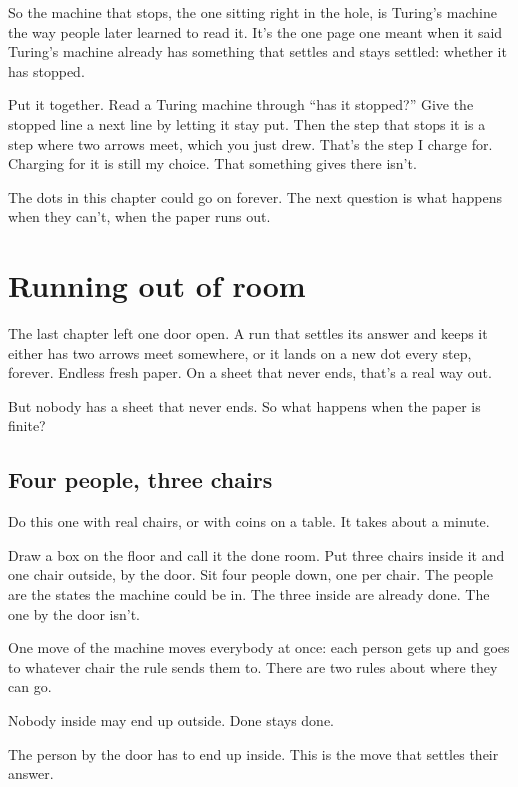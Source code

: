 \documentclass[11pt,twoside]{article}
\theoremstyle{thielethm}
\theoremstyle{thieledef}
\theoremstyle{thieledef}
\theoremstyle{thieledef}
\theoremstyle{thielethm}
\theoremstyle{thieleobs}
\theoremstyle{thielethm}
\begin{document}
So the machine that stops, the one sitting right in the hole, is Turing's machine the way people later learned to read it. It's the one page one meant when it said Turing's machine already has something that settles and stays settled: whether it has stopped.

Put it together. Read a Turing machine through ``has it stopped?'' Give the stopped line a next line by letting it stay put. Then the step that stops it is a step where two arrows meet, which you just drew. That's the step I charge for. Charging for it is still my choice. That something gives there isn't.

The dots in this chapter could go on forever. The next question is what happens when they can't, when the paper runs out.

\section{Running out of room}
\label{sec:room}

The last chapter left one door open. A run that settles its answer and keeps it either has two arrows meet somewhere, or it lands on a new dot every step, forever. Endless fresh paper. On a sheet that never ends, that's a real way out.

But nobody has a sheet that never ends. So what happens when the paper is finite?

\subsection{Four people, three chairs}

Do this one with real chairs, or with coins on a table. It takes about a minute.

Draw a box on the floor and call it the done room. Put three chairs inside it and one chair outside, by the door. Sit four people down, one per chair. The people are the states the machine could be in. The three inside are already done. The one by the door isn't.

One move of the machine moves everybody at once: each person gets up and goes to whatever chair the rule sends them to. There are two rules about where they can go.

Nobody inside may end up outside. Done stays done.

The person by the door has to end up inside. This is the move that settles their answer.
\end{document}

